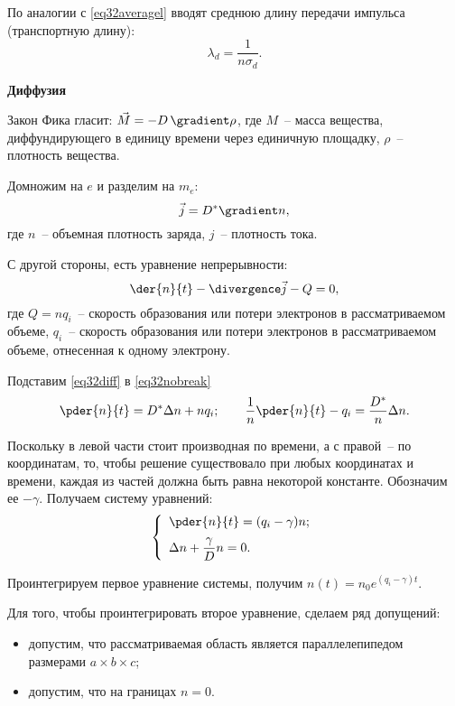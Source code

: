 По аналогии с \eqref{eq32averagel} вводят среднюю длину передачи импульса
(транспортную длину):
\[
  \lambda_d = \frac{1}{n\sigma_d}.
\]


\hspace{1.5em}\textbf{Диффузия}

Закон Фика гласит: \( \vec{M} = -D\,\gradient\rho \), где \( M \)~-- масса
вещества, диффундирующего в единицу времени через единичную площадку,
\( \rho \)~-- плотность вещества.

Домножим на \( e \) и разделим на \( m_e \):
\begin{equation}
  \vec{j} = D^* \gradient n,
  \label{eq32diff}
\end{equation}
где \( n \)~-- объемная плотность заряда, \( j \)~-- плотность тока.

С другой стороны, есть уравнение непрерывности:
\begin{equation}
  \der{n}{t} - \divergence\vec{j} - Q = 0,
  \label{eq32nobreak}
\end{equation}
где \( Q = nq_i \)~-- скорость образования или потери электронов в рассматриваемом
объеме, \( q_i \)~-- скорость образования или потери электронов в рассматриваемом
объеме, отнесенная к одному электрону.

Подставим \eqref{eq32diff} в \eqref{eq32nobreak}
\[
  \pder{n}{t} = D^*\D n + nq_i; \qquad
    \frac{1}{n}\pder{n}{t} - q_i = \frac{D^*}{n}\D n.
\]

Поскольку в левой части стоит производная по времени, а с правой~-- по
координатам, то, чтобы решение существовало при любых координатах и времени,
каждая из частей должна быть равна некоторой константе. Обозначим ее
\( -\gamma \). Получаем систему уравнений:
\[
  \left\{
    \begin{array}{l}
      \displaystyle\pder{n}{t} = (q_i - \gamma)n; \\[.6em]
      \D n + \dfrac{\gamma}{D}n = 0.
    \end{array}
  \right.
\]

Проинтегрируем первое уравнение системы, получим
\(
  n(t) = n_0 e^{(q_i - \gamma)t}
\).

Для того, чтобы проинтегрировать второе уравнение, сделаем ряд допущений:
\begin{itemize}
  \item допустим, что рассматриваемая область является параллелепипедом
    размерами \( a\times b\times c \);
  \item допустим, что на границах \( n = 0 \).
\end{itemize}

